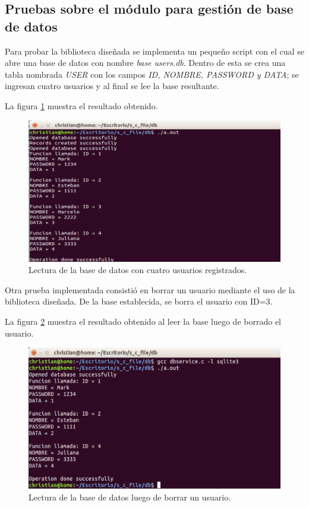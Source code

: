 \subsection{Pruebas sobre el módulo para gestión de base de datos}
Para probar la biblioteca diseñada se implementa un pequeño script con el cual se abre una base de datos con nombre \textit{base users.db}. Dentro de esta se crea una tabla nombrada \textit{USER} con los campos \textit{ID, NOMBRE, PASSWORD y DATA}; se ingresan cuatro usuarios y al final se lee la base resultante.

La figura \ref{fig:baseuno} muestra el resultado obtenido.

\begin{figure}[H]
	\centering
	\includegraphics[scale=.3]{./Figures/baseuno.png}
	\caption{Lectura de la base de datos con cuatro usuarios registrados.}
	\label{fig:baseuno}
\end{figure}

Otra prueba implementada consistió en borrar un usuario mediante el uso de la biblioteca diseñada. De la base establecida, se borra el usuario con ID=3.

La figura \ref{fig:basedos} muestra el resultado obtenido al leer la base luego de borrado el usuario.

\begin{figure}[H]
	\centering
	\includegraphics[scale=.3]{./Figures/basedos.png}
	\caption{Lectura de la base de datos luego de borrar un usuario.}
	\label{fig:basedos}
\end{figure}


